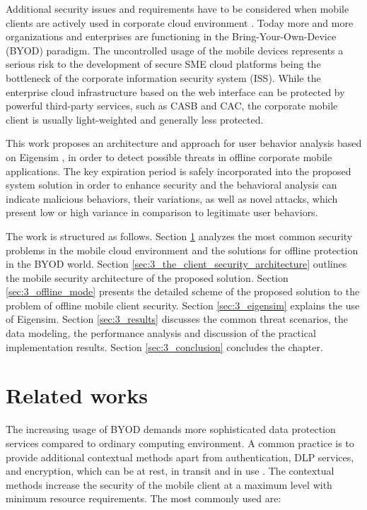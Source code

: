 Additional security issues and requirements have to be considered when mobile clients are actively used in corporate cloud environment \cite{yovel2014}. Today more and more organizations and enterprises are functioning in the Bring-Your-Own-Device (BYOD) paradigm. The uncontrolled usage of the mobile devices represents a serious risk to the development of secure SME cloud platforms being the bottleneck of the corporate information security system (ISS). While the enterprise cloud infrastructure based on the web interface can be protected by powerful third-party services, such as CASB and CAC, the corporate mobile client is usually light-weighted and generally less protected. 

This work proposes an architecture and approach for user behavior analysis based on Eigensim \cite{vieira2017model}, in order to detect possible threats in offline corporate mobile applications. The key expiration period is safely incorporated into the proposed system solution in order to enhance security and the behavioral analysis can indicate malicious behaviors, their variations, as well as novel attacks, which present low or high variance in comparison to legitimate user behaviors.

The work is structured as follows. Section \ref{sec:3_related_works} analyzes the most common security problems in the mobile cloud environment and the solutions for offline protection in the BYOD world. Section \ref{sec:3_the_client_security_architecture} outlines the mobile security architecture of the proposed solution. Section \ref{sec:3_offline_mode} presents the detailed scheme of the proposed solution to the problem of offline mobile client security. Section \ref{sec:3_eigensim} explains the use of Eigensim. Section \ref{sec:3_results} discusses the common threat scenarios, the data modeling, the performance analysis and discussion of the practical implementation results. Section \ref{sec:3_conclusion} concludes the chapter.


\section{Related works}
\label{sec:3_related_works}

The increasing usage of BYOD demands more sophisticated data protection services compared to ordinary computing environment. A common practice is to provide additional contextual methods apart from authentication, DLP services, and encryption, which can be at rest, in transit and in use \cite{yovel2014, khan2015cloud, khan2014survey, khan2013towards}. The contextual methods increase the security of the mobile client at a maximum level with minimum resource requirements. The most commonly used are:

